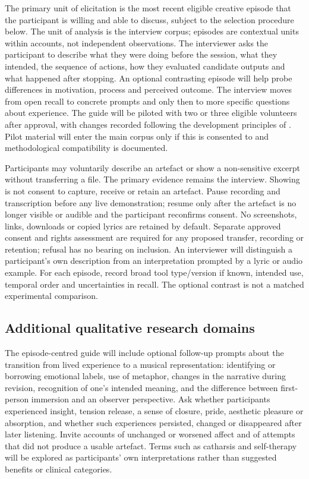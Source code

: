 The primary unit of elicitation is the most recent eligible creative episode that the participant is willing and able to discuss, subject to the selection procedure below. The unit of analysis is the interview corpus; episodes are contextual units within accounts, not independent observations. The interviewer asks the participant to describe what they were doing before the session, what they intended, the sequence of actions, how they evaluated candidate outputs and what happened after stopping. An optional contrasting episode will help probe differences in motivation, process and perceived outcome. The interview moves from open recall to concrete prompts and only then to more specific questions about experience. The guide will be piloted with two or three eligible volunteers after approval, with changes recorded following the development principles of \citet{kallio2016}. Pilot material will enter the main corpus only if this is consented to and methodological compatibility is documented.

Participants may voluntarily describe an artefact or show a non-sensitive excerpt without transferring a file. The primary evidence remains the interview. Showing is not consent to capture, receive or retain an artefact. Pause recording and transcription before any live demonstration; resume only after the artefact is no longer visible or audible and the participant reconfirms consent. No screenshots, links, downloads or copied lyrics are retained by default. Separate approved consent and rights assessment are required for any proposed transfer, recording or retention; refusal has no bearing on inclusion. An interviewer will distinguish a participant's own description from an interpretation prompted by a lyric or audio example. For each episode, record broad tool type/version if known, intended use, temporal order and uncertainties in recall. The optional contrast is not a matched experimental comparison.
\subsection{Additional qualitative research domains}
The episode-centred guide will include optional follow-up prompts about the transition from lived experience to a musical representation: identifying or borrowing emotional labels, use of metaphor, changes in the narrative during revision, recognition of one's intended meaning, and the difference between first-person immersion and an observer perspective. Ask whether participants experienced insight, tension release, a sense of closure, pride, aesthetic pleasure or absorption, and whether such experiences persisted, changed or disappeared after later listening. Invite accounts of unchanged or worsened affect and of attempts that did not produce a usable artefact. Terms such as catharsis and self-therapy will be explored as participants' own interpretations rather than suggested benefits or clinical categories.


